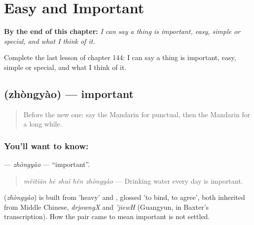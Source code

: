 
\chapter{Easy and Important}
\label{ch:zh-easy-and-important}

\begin{chapteropening}
\textbf{By the end of this chapter:} \emph{I can say a thing is important, easy, simple or special, and what I think of it.}

Complete the last lesson of chapter 144: I can say a thing is important, easy, simple or special, and what I think of it.
\end{chapteropening}

\section[\texorpdfstring{\zh{重要} (zhòngyào)}{重要 (zhòngyào)}]{ (zhòngyào) — important}

\label{lesson:ZH-C144-zhongyao}



\begin{quote}
Before the new one: say the Mandarin for punctual, then the Mandarin for a long while.
\end{quote}

\subsection*{You'll want to know: }
\textbf{} — \emph{zhòngyào} — \textquotedblleft{}important\textquotedblright{}.

\begin{quote}
\textbf{} \emph{měitiān hē shuǐ hěn zhòngyào} — Drinking water every day is important.
\end{quote}

\begin{cousinweb}
\textbf{} (\emph{zhòngyào}) is built from  'heavy' and , glossed 'to bind, to agree', both inherited from Middle Chinese, \emph{drjowngX} and \emph{'jiewH} (Guangyun, in Baxter's transcription). How the pair came to mean important is not settled.
\end{cousinweb}

